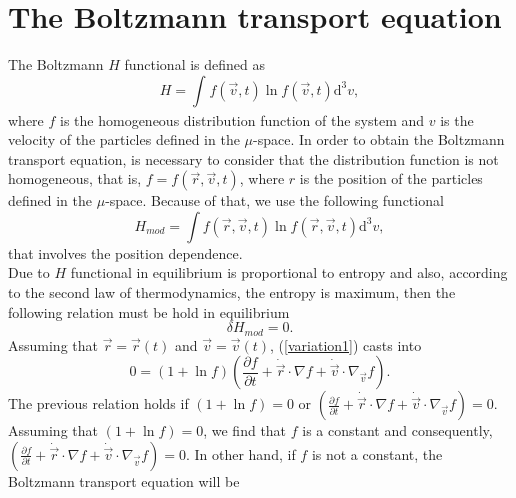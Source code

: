 \documentclass{article}
\begin{document}
\section{The Boltzmann transport equation}
The Boltzmann $H$ functional is defined as
\begin{equation}
    H=\int_{}^{}f(\vec{v},t)\ln f(\vec{v},t)\mathrm{d}^{3}v,
\end{equation}
where $f$ is the homogeneous distribution function of the system and $v$ is the velocity of the particles defined in the $\mu$-space. In order to obtain the Boltzmann transport equation, is necessary to consider that the distribution function is not homogeneous, that is, $f=f(\vec{r},\vec{v},t)$, where $r$ is the position of the particles defined in the $\mu$-space. Because of that, we use the following functional
\begin{equation}
    H_{mod}=\int f(\vec{r},\vec{v},t) \ln f(\vec{r},\vec{v},t) \mathrm{d}^{3}v,
\end{equation}
that involves the position dependence.
\\
Due to $H$ functional in equilibrium is proportional to entropy and also, according to the second law of thermodynamics, the entropy is maximum, then the following relation must be hold in equilibrium
\begin{equation}
    \delta H_{mod}=0.\label{variation1}
\end{equation}
Assuming that $\vec{r}=\vec{r}(t)$ and $\vec{v}=\vec{v}(t)$, (\ref{variation1}) casts into
\begin{equation}
    0=\left( 1+\ln f \right)\left( \frac{\partial f}{\partial t}+\dot{\vec{r}}\cdot \nabla f+\dot{\vec{v}}\cdot \nabla_{\vec{v}} f \right).
\end{equation}
The previous relation holds if $(1+\ln f)=0$ or $(\frac{\partial f}{\partial t}+\dot{\vec{r}}\cdot \nabla f+\dot{\vec{v}}\cdot \nabla_{\vec{v}} f)=0$.\\
Assuming that $(1+\ln f)=0$, we find that $f$ is a constant and consequently, $(\frac{\partial f}{\partial t}+\dot{\vec{r}}\cdot \nabla f+\dot{\vec{v}}\cdot \nabla_{\vec{v}} f)=0$. In other hand, if $f$ is not a constant, the Boltzmann transport equation will be
\end{document}
